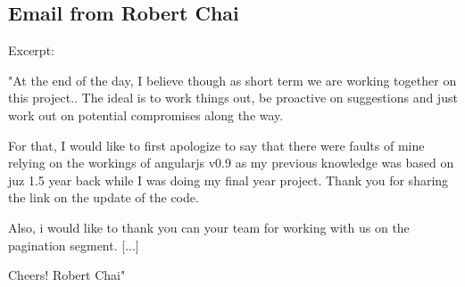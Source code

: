 \subsection{Email from Robert Chai}
\label{app:robertsletter}
Excerpt: 

"At the end of the day, I believe though as short term we are working together
on this project.. The ideal is to work things out, be proactive on suggestions
and just work out on potential compromises along the way.

For that, I would like to first apologize to say that there were faults of mine
relying on the workings of angularjs v0.9 as my previous knowledge was based on
juz 1.5 year back while I was doing my final year project. Thank you for
sharing the link on the update of the code.

Also, i would like to thank you can your team for working with us on the
pagination segment.
[...]

Cheers! 
Robert Chai"
